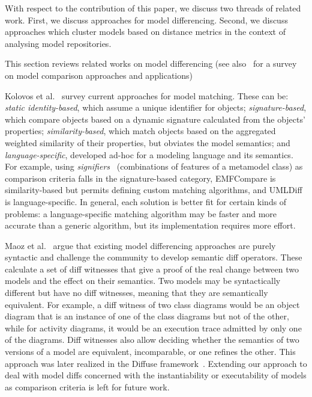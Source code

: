 With respect to the contribution of this paper, we discuss two threads of related work. First, we discuss approaches for model differencing. Second, we discuss approaches which cluster models based on distance metrics in the context of analysing model repositories.


This section reviews related works on model differencing (see also~\cite{StephanC13} for a survey on
model comparison approaches and applications)

Kolovos et al.~\cite{Kolovos2009} survey current approaches for model matching. These can be: {\em static identity-based}, 
which assume a unique identifier for objects; {\em signature-based}, which compare objects based on a dynamic signature 
calculated from the objects' properties; {\em similarity-based}, which match objects based on the aggregated 
weighted similarity of their properties, but obviates the model semantics; and {\em language-specific}, developed 
ad-hoc for a modeling language and its semantics. For example, using {\em signifiers}~\cite{LangerWGKV12} 
(\ie combinations of features of a metamodel class) as comparison criteria falls in the signature-based category, 
EMFCompare is similarity-based but permits defining custom matching algorithms, and UMLDiff is language-specific. 
In general, each solution is better fit for certain kinds of problems: a language-specific matching algorithm may 
be faster and more accurate than a generic algorithm, but its implementation requires more effort.

Maoz et al.~\cite{MaozRR10} argue that existing model differencing approaches are purely syntactic and 
challenge the community to develop semantic diff operators. These calculate a set of diff witnesses that give 
a proof of the real change between two models and the effect on their semantics. Two models may be syntactically 
different but have no diff witnesses, meaning that they are semantically equivalent. For example, a diff witness 
of two class diagrams would be an object diagram that is an instance of one of the class diagrams but not of 
the other, while for activity diagrams, it would be an execution trace admitted by only one of the diagrams. 
Diff witnesses also allow deciding whether the semantics of two versions of a model are equivalent, incomparable, 
or one refines the other. This approach was later realized in the Diffuse framework~\cite{MaozR18}.
Extending our approach to deal with model diffs concerned with the instantiability or 
executability of models as comparison criteria is left for future work.

